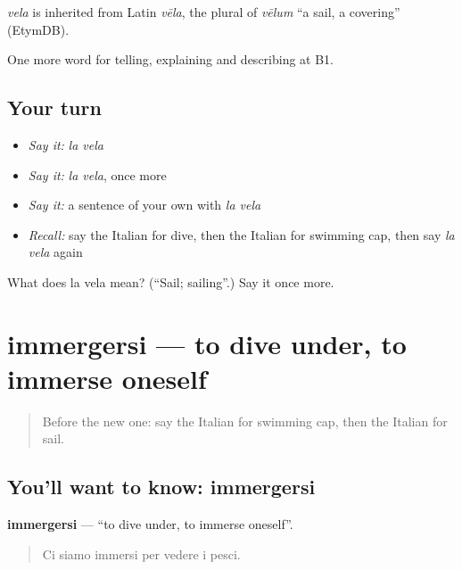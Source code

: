 \begin{cousinweb}
\emph{vela} is inherited from Latin \emph{vēla}, the plural of \emph{vēlum} \textquotedblleft{}a sail, a covering\textquotedblright{} (EtymDB).
\end{cousinweb}

\begin{grammarlens}[title={What you've built}]
One more word for telling, explaining and describing at B1.
\end{grammarlens}

\subsection*{Your turn}
\begin{itemize}
\raggedright
  \item \emph{Say it:} \emph{la vela}
  \item \emph{Say it:} \emph{la vela}, once more
  \item \emph{Say it:} a sentence of your own with \emph{la vela}
  \item \emph{Recall:} say the Italian for dive, then the Italian for swimming cap, then say \emph{la vela} again
\end{itemize}

\begin{tcolorbox}[breakable,colback=teal!4,colframe=teal!35!black,title={Before you move on}]
What does la vela mean? (\textquotedblleft{}Sail; sailing\textquotedblright{}.) Say it once more.
\end{tcolorbox}
\section[immergersi]{immergersi — to dive under, to immerse oneself}

\label{lesson:IT-C514-immergersi}



\begin{quote}
Before the new one: say the Italian for swimming cap, then the Italian for sail.
\end{quote}

\subsection*{You'll want to know: immergersi}
\textbf{immergersi} — \textquotedblleft{}to dive under, to immerse oneself\textquotedblright{}.

\begin{quote}
Ci siamo immersi per vedere i pesci.
\end{quote}

